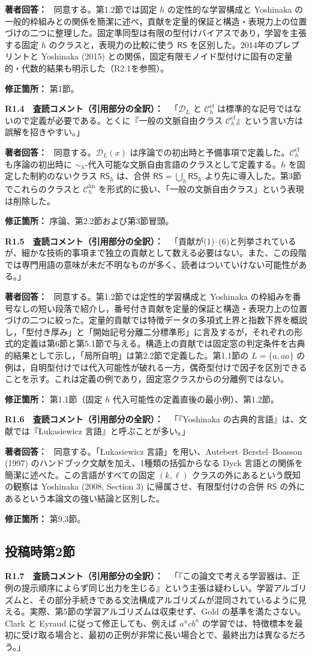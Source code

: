 \documentclass[10pt,a4paper]{ltjsarticle}
\newcommand{\Comment}[1]{\par\medskip\noindent\textbf{#1　査読コメント（引用部分の全訳）：}\ }
\newcommand{\Reply}{\par\noindent\textbf{著者回答：}\ }
\newcommand{\Location}[1]{\par\noindent\textbf{修正箇所：} #1\par}
\newcommand{\Chlin}{\mathcal C_h^{\mathrm{lin}}}
\newcommand{\RSh}{\mathsf{RS}_h}
\newcommand{\RS}{\mathsf{RS}}
\begin{document}
\Reply
同意する。第1.2節では固定 $h$ の定性的な学習構成と Yoshinaka の一般的枠組みとの関係を簡潔に述べ，貢献を定量的保証と構造・表現力上の位置づけの二つに整理した。固定準同型は有限の型付けバイアスであり，学習を主張する固定 $h$ のクラスと，表現力の比較に使う $\RS$ を区別した。2014年のプレプリントと Yoshinaka (2015) との関係，固定有限モノイド型付けに固有の定量的・代数的結果も明示した（R2.1を参照）。
\Location{第1節。}

\Comment{R1.4}
「$\mathcal D_L$ と $\mathcal C_h^{\mathrm{cf}}$ は標準的な記号ではないので定義が必要である。とくに『一般の文脈自由クラス $\mathcal C_h^{\mathrm{cf}}$』という言い方は誤解を招きやすい。」

\Reply
同意する。$\mathcal D_L(x)$ は序論での初出時と予備事項で定義した。$\mathcal C_h^{\mathrm{cf}}$ も序論の初出時に $\sim_h$-代入可能な文脈自由言語のクラスとして定義する。$h$ を固定した制約のないクラス $\RSh$ は、合併 $\RS=\bigcup_h\RSh$ より先に導入した。第3節でこれらのクラスと $\Chlin$ を形式的に扱い、「一般の文脈自由クラス」という表現は削除した。
\Location{序論、第2.2節および第3節冒頭。}

\Comment{R1.5}
「貢献が(1)--(6)と列挙されているが、細かな技術的事項まで独立の貢献として数える必要はない。また、この段階では専門用語の意味が未だ不明なものが多く、読者はついていけない可能性がある。」

\Reply
同意する。第1.2節では定性的学習構成と Yoshinaka の枠組みを番号なしの短い段落で紹介し，番号付き貢献を定量的保証と構造・表現力上の位置づけの二つに絞った。定量的貢献では特徴データの多項式上界と指数下界を概説し，「型付き厚み」と「開始記号分離二分標準形」に言及するが，それぞれの形式的定義は第6節と第5.1節で与える。構造上の貢献では固定窓の判定条件を古典的結果として示し，「局所自明」は第2.2節で定義した。第1.1節の $L=\{a,aa\}$ の例は，自明型付けでは代入可能性が破れる一方，偶奇型付けで因子を区別できることを示す。これは定義の例であり，固定窓クラスからの分離例ではない。
\Location{第1.1節（固定 $h$ 代入可能性の定義直後の最小例）、第1.2節。}

\Comment{R1.6}
「『Yoshinaka の古典的言語』は、文献では『Łukasiewicz 言語』と呼ぶことが多い。」

\Reply
同意する。「Łukasiewicz 言語」を用い、Autebert--Berstel--Boasson (1997) のハンドブック文献を加え、1種類の括弧からなる Dyck 言語との関係を簡潔に述べた。この言語がすべての固定 $(k,\ell)$ クラスの外にあるという既知の観察は Yoshinaka (2008, Section 3) に帰属させ、有限型付けの合併 $\RS$ の外にあるという本論文の強い結論と区別した。
\Location{第9.3節。}

\subsection*{投稿時第2節}
\Comment{R1.7}
「『この論文で考える学習器は、正例の提示順序によらず同じ出力を生じる』という主張は疑わしい。学習アルゴリズムと、その部分手続きである文法構成アルゴリズムが混同されているように見える。実際、第5節の学習アルゴリズムは収束せず、Gold の基準を満たさない。Clark と Eyraud に従って修正しても、例えば $a^ncb^n$ の学習では、特徴標本を最初に受け取る場合と、最初の正例が非常に長い場合とで、最終出力は異なるだろう。」
\end{document}
